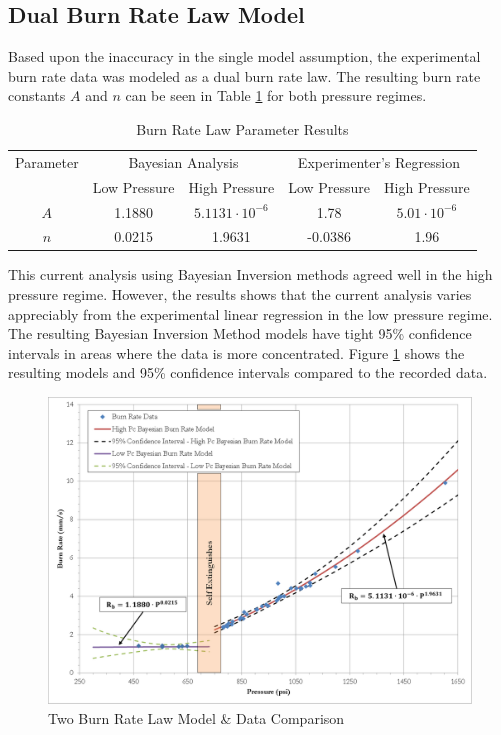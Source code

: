 \documentclass{article}
\begin{document}
\subsection{Dual Burn Rate Law Model} \label{twoBurnRateResults}

Based upon the inaccuracy in the single model assumption, the experimental burn rate data was modeled
as a dual burn rate law. The resulting burn rate constants $A$ and $n$ can be seen in Table
\ref{Table:brlpresults} for both pressure regimes. 

\begin{table}
\caption{Burn Rate Law Parameter Results}
\label{Table:brlpresults}
\begin{tabular}{|c|c|c|c|c|}
\hline
Parameter & \multicolumn{2}{|c|}{Bayesian Analysis} & \multicolumn{2}{|c|}{Experimenter's Regression} \\ \cline{2-5}
 & Low Pressure & High Pressure & Low Pressure & High Pressure \\ \hline
$A$ & 1.1880 & $5.1131 \cdot 10^{-6}$ & 1.78 & $5.01 \cdot 10^{-6}$ \\ \hline
$n$ & 0.0215 & 1.9631 & -0.0386 & 1.96 \\
\hline
\end{tabular}
\end{table}

This current analysis using Bayesian Inversion methods agreed well in the high pressure regime. However, the
results shows that the current analysis varies appreciably from the experimental linear regression in the low
pressure regime. The resulting Bayesian Inversion Method models have tight 95\% confidence intervals in 
areas where the data is more concentrated. Figure \ref{DualBRfig} shows the resulting models and 95\% confidence 
intervals compared to the recorded data.

\begin{figure}[htb]
\centering
\includegraphics[width=\textwidth]{Dual_Burn_Rate_Results.png}
\caption{Two Burn Rate Law Model \& Data Comparison}
\label{DualBRfig}
\end{figure}
\end{document}
